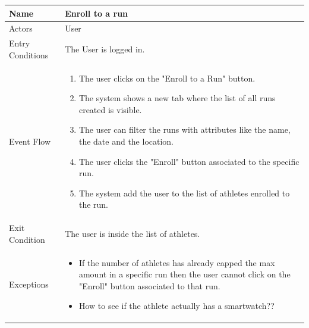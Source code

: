 \begin{enumerate}
\FloatBarrier
\begin{table}[h]
\begin{tabular}{|l|p{}|}
\hline
Name             & Enroll to a run \\ \hline
Actors           & User  \\ \hline
Entry Conditions & The User is logged in.    \\ \hline
Event Flow       & \begin{enumerate}
            \item The user clicks on the "Enroll to a Run" button.
            \item The system shows a new tab where the list of all runs created is visible.
            \item The user can filter the runs with attributes like the name, the date and the location.
            \item The user clicks the "Enroll" button associated to the specific run.
            \item The system add the user to the list of athletes enrolled to the run.
        \end{enumerate}\\ \hline
Exit Condition   & The user is inside the list of athletes.\\ \hline
Exceptions       & \begin{itemize}
\item If the number of athletes has already capped the max amount in a specific run then the user cannot click on the "Enroll" button associated to that run.
\item How to see if the athlete actually has a smartwatch??
\end{itemize}\\ \hline
\end{tabular}
\end{table}
\FloatBarrier


\end{enumerate}
